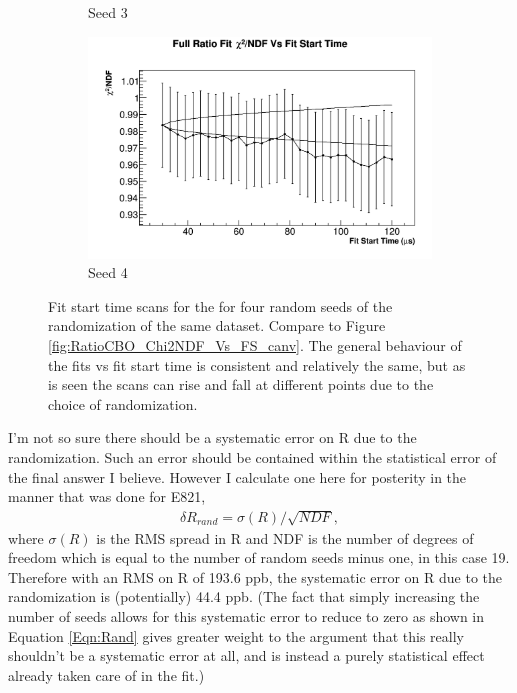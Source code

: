 \begin{figure}[]
\begin{subfigure}[t]{0.45\textwidth}
			    \caption{Seed 3}
		    \end{subfigure}
		    \begin{subfigure}[t]{0.45\textwidth}
			    \centering
				\includegraphics[width=\textwidth]{RatioCBO_Chi2NDF_Vs_FS_canv-Seed18}
			    \caption{Seed 4}
		    \end{subfigure}%
		\caption[RandomSeedFitStartScans]{Fit start time scans for the \chisq for four random seeds of the randomization of the same dataset. Compare to Figure \ref{fig:RatioCBO_Chi2NDF_Vs_FS_canv}. The general behaviour of the fits vs fit start time is consistent and relatively the same, but as is seen the scans can rise and fall at different points due to the choice of randomization.}
		\label{fig:RandomSeedFitStartScans}
		\end{figure}

		I'm not so sure there should be a systematic error on R due to the randomization. Such an error should be contained within the statistical error of the final answer I believe. However I calculate one here for posterity in the manner that was done for E821,
			\begin{align}
				\delta R_{rand} = \sigma(R)/\sqrt{NDF},
			\label{Eqn:Rand}
			\end{align}
		where $\sigma(R)$ is the RMS spread in R and NDF is the number of degrees of freedom which is equal to the number of random seeds minus one, in this case 19. Therefore with an RMS on R of 193.6 ppb, the systematic error on R due to the randomization is (potentially) 44.4 ppb. (The fact that simply increasing the number of seeds allows for this systematic error to reduce to zero as shown in Equation \ref{Eqn:Rand} gives greater weight to the argument that this really shouldn't be a systematic error at all, and is instead a purely statistical effect already taken care of in the fit.)



